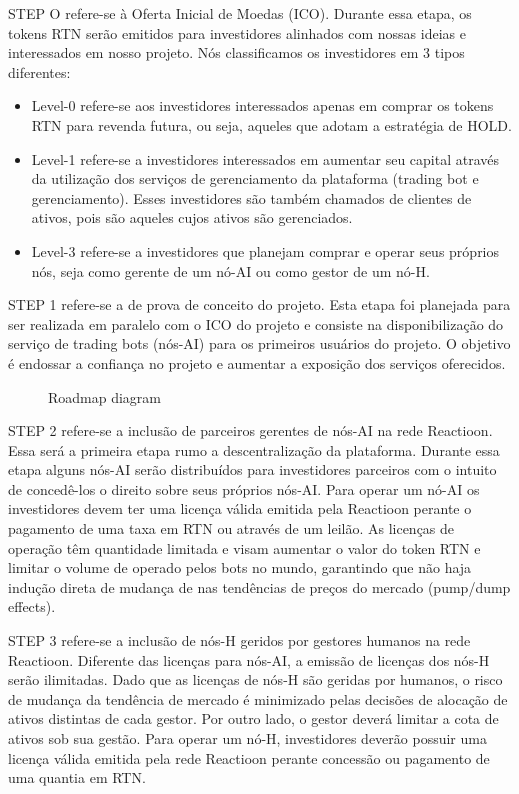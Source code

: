 \documentclass[
	article,			%
	12pt,				%
	oneside,			%
	a4paper,			%
	brazil,				%
	english,
	sumario=tradicional
	]{abntex2}
\begin{document}
STEP O refere-se à Oferta Inicial de Moedas (ICO). Durante essa etapa, os tokens RTN serão emitidos para investidores alinhados com nossas ideias e interessados em nosso projeto. Nós classificamos os investidores em 3 tipos diferentes:
\begin{itemize}
    \item Level-0 refere-se aos investidores interessados apenas em comprar os tokens RTN para revenda futura, ou seja, aqueles que adotam a estratégia de HOLD. 
    \item Level-1 refere-se a investidores interessados em aumentar seu capital através da utilização dos serviços de gerenciamento da plataforma (trading bot e gerenciamento). Esses investidores são também chamados de clientes de ativos, pois são aqueles cujos ativos são gerenciados. 
    
    \item Level-3 refere-se a investidores que planejam comprar e operar seus próprios nós, seja como gerente de um nó-AI ou como gestor de um nó-H.
\end{itemize}

STEP 1 refere-se a de prova de conceito do projeto. Esta etapa foi planejada para ser realizada em paralelo com o ICO do projeto e consiste na disponibilização do serviço de trading bots (nós-AI) para os primeiros usuários do projeto. O objetivo é endossar a confiança no projeto e aumentar a exposição dos serviços oferecidos.

\begin{figure}[H]
    \centering
    \makebox[\textwidth]{}
\caption{Roadmap diagram}
\end{figure}
STEP 2 refere-se a inclusão de parceiros gerentes de nós-AI na rede Reactioon. Essa será a primeira etapa rumo a descentralização da plataforma. Durante essa etapa alguns nós-AI serão distribuídos para investidores parceiros com o intuito de concedê-los o direito sobre seus próprios nós-AI. Para operar um nó-AI os investidores devem ter uma licença válida emitida pela Reactioon perante o pagamento de uma taxa em RTN ou através de um leilão. As licenças de operação têm quantidade limitada e visam aumentar o valor do token RTN e limitar o volume de operado pelos bots no mundo, garantindo que não haja indução direta de mudança de nas tendências de preços do mercado (pump/dump effects). 


STEP 3 refere-se a inclusão de nós-H geridos por gestores humanos na rede Reactioon. Diferente das licenças para nós-AI, a emissão de licenças dos nós-H serão ilimitadas. Dado que as licenças de nós-H são geridas por humanos, o risco de mudança da tendência de mercado é minimizado pelas decisões de alocação de ativos distintas de cada gestor. Por outro lado, o gestor deverá limitar a cota de ativos sob sua gestão. Para operar um nó-H, investidores deverão possuir uma licença válida emitida pela rede Reactioon perante concessão ou pagamento de uma quantia em RTN. 
\end{document}
